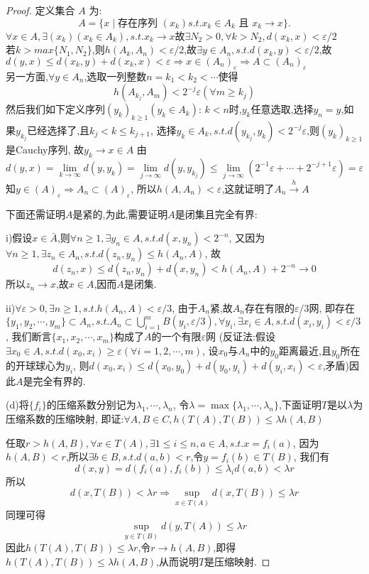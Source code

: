 \begin{proof}
    定义集合 $A$ 为:
    \[A=\{x\mid\text{存在序列\ }(x_k) s.t. x_k\in A_k\text{\ 且\ }x_k\rightarrow x\}.\]
    $\forall x\in A,\exists (x_k)(x_k\in A_k),s.t.x_k\rightarrow x$故$\exists N_2>0,\forall k>N_2,d(x_k,x)<\varepsilon /2$\\
    若$k>max\{N_1,N_2\}$,则$h(A_k,A_n)<\varepsilon /2$,故$\exists y\in A_n,s.t.d(x_k,y)<\varepsilon /2$,故$d(y,x)\leq d(x_k,y)+d(x_k,x)<\varepsilon\Rightarrow x\in (A_n)_\varepsilon\Rightarrow A\subset (A_n)_\varepsilon$\\
    另一方面,$\forall y\in A_n$,选取一列整数$n=k_1<k_2<\cdots$使得\[h(A_{k_j},A_m)<2^{-j}\varepsilon (\forall m\geq k_j)\]
    然后我们如下定义序列$(y_k)_{k\geq 1}(y_k\in A_k)$:
    $k<n$时,$y_k$任意选取,选择$y_n=y$,如果$y_{k_j}$已经选择了,且$k_j<k\leq k_{j+1}$,
    选择$y_k\in A_k,s.t.d(y_{k_j},y_k)<2^{-j}\varepsilon$,则$(y_k)_{k\geq 1}$是Cauchy序列,
    故$y_k\rightarrow x\in A$
    由
    \[d(y,x)=\lim_{k\to\infty}d(y,y_k)=\lim_{j\to\infty}d(y,y_{k_j})\leq\lim_{j\to\infty}(2^{-1}\varepsilon +\cdots +2^{-j+1}\varepsilon)=\varepsilon\]
    知$ y\in (A)_\varepsilon\Rightarrow A_n\subset (A)_\varepsilon$,
    所以$h(A,A_n)<\varepsilon$,这就证明了$A_n\xrightarrow{h}A$
    
    下面还需证明$A$是紧的,为此,需要证明$A$是闭集且完全有界:

    i)假设$x\in\bar{A}$,则$\forall n\geq 1,\exists y_n\in A,s.t.d(x,y_n)<2^{-n}$,
    又因为$\forall n\geq 1,\exists z_n\in A_n,s.t.d(z_n,y_n)\leq h(A_n,A)$,
    故\[d(z_n,x)\leq d(z_n,y_n)+d(x,y_n)<h(A_n,A)+2^{-n}\rightarrow 0\]
    所以$z_n\rightarrow x$,故$x\in A$,因而$A$是闭集.

    ii)$\forall\varepsilon >0,\exists n\geq 1,s.t.h(A_n,A)<\varepsilon/3$,
    由于$A_n$紧,故$A_n$存在有限的$\varepsilon/3$网,
    即存在$\{y_1,y_2,\cdots,y_m\}\subset A_n,s.t.A_n\subset\bigcup_{i=1}^mB(y_i,\varepsilon/3),\forall y_i,\exists x_i\in A,s.t.d(x_i,y_i)<\varepsilon/3$,
    我们断言$\{x_1,x_2,\cdots,x_m\}$构成了$A$的一个有限$\varepsilon$网
    (反证法:假设$\exists x_0\in A,s.t.d(x_0,x_i)\geq\varepsilon(\forall i=1,2,\cdots,m)$,
    设$x_0$与$A_n$中的$y_0$距离最近,且$y_0$所在的开球球心为$y_i$,
    则$d(x_0,x_i)\leq d(x_0,y_0)+d(y_0,y_i)+d(y_i,x_i)<\varepsilon$,矛盾)因此$A$是完全有界的.

    (d)将$\{f_i\}$的压缩系数分别记为$\lambda_1,\cdots,\lambda_n$,
    令$\lambda=\max\{\lambda_1,\cdots,\lambda_n\}$,下面证明$T$是以$\lambda$为压缩系数的压缩映射,
    即证:$\forall A,B\in C,h(T(A),T(B))\leq\lambda h(A,B)$

    任取$r>h(A,B),\forall x\in T(A),\exists 1\leq i\leq n,a\in A,s.t.x=f_i(a)$,
    因为$h(A,B)<r$,所以$\exists b\in B,s.t.d(a,b)<r$,令$y=f_i(b)\in T(B)$,
    我们有\[d(x,y)=d(f_i(a),f_i(b))\leq\lambda_i d(a,b)<\lambda r\]
    所以\[d(x,T(B))<\lambda r\Rightarrow\sup_{x\in T(A)}d(x,T(B))\leq\lambda r\]
    同理可得
    \[\sup_{y\in T(B)}d(y,T(A))\leq\lambda r\]
    因此$h(T(A),T(B))\leq\lambda r$,令$r\to h(A,B)$,即得$h(T(A),T(B))\leq\lambda h(A,B)$,从而说明$T$是压缩映射.
\end{proof}